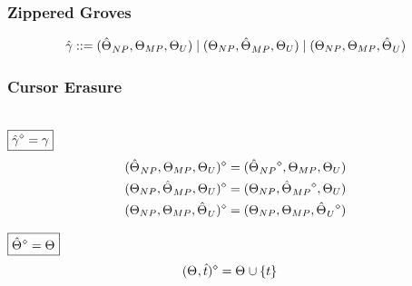 
\subsubsection{Zippered Groves}

\begin{gather*}
  \arraycolsep=0pt
  \begin{array}{lll}
    \Z{\gamma} & {}::={} &
      (\Z{\Set}_{NP}, \Set[MP], \Set[U])
      \mid (\Set[NP], \Z{\Set}_{MP}, \Set[U])
      \mid (\Set[NP], \Set[MP], \Z{\Set}_U)
  \end{array}
\end{gather*}


\subsubsection{Cursor Erasure}\hspace*{\fill} \\

\noindent $\boxed{\erase{\Z{\gamma}} = \gamma}$
%
\begin{align*}
  \erase{(\Z{\Set}_{NP}, \Set[MP], \Set[U])} &= (\erase{\Z{\Set}_{NP}}, \Set[MP], \Set[U]) \\
  \erase{(\Set[NP], \Z{\Set}_{MP}, \Set[U])} &= (\Set[NP], \erase{\Z{\Set}_{MP}}, \Set[U]) \\
  \erase{(\Set[NP], \Set[MP], \Z{\Set}_U)} &= (\Set[NP], \Set[MP], \erase{\Z{\Set}_U})
\end{align*}

\noindent $\boxed{\erase{\Z{\Set}} = \Set}$
%
\begin{align*}
  \erase{(\Set, \Z{t})} &= \Set \cup \SetOf{t}
\end{align*}

